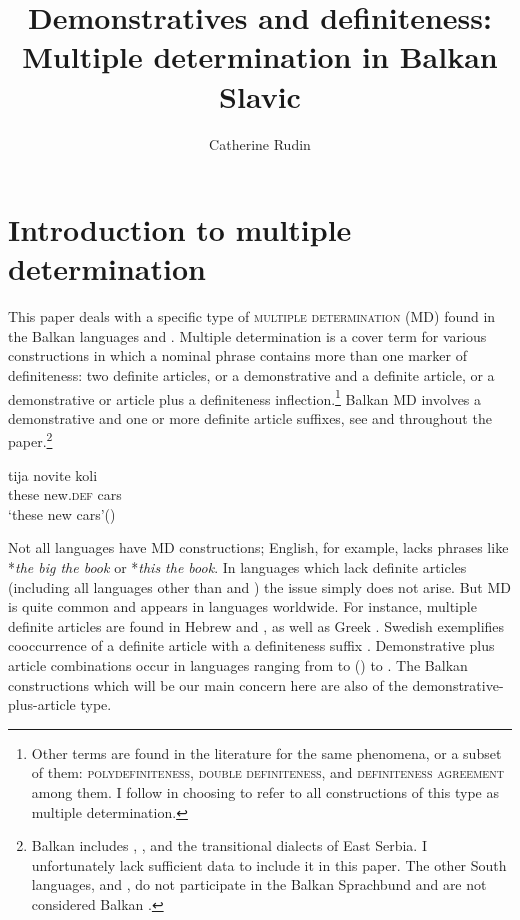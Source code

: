 \documentclass[output=paper]{langscibook}
\author{Catherine Rudin\affiliation{Wayne State College}}
\title[Multiple determination in Balkan Slavic]{Demonstratives and definiteness: Multiple determination in Balkan Slavic}
\begin{document}
\maketitle

\section{Introduction to multiple determination}
This paper deals with a specific type of \textsc{multiple determination} (MD) found in the Balkan  languages  and . Multiple determination is a cover term for various constructions in which a nominal phrase contains more than one marker of definiteness: two definite articles, or a demonstrative and a definite article, or a demonstrative or article plus a definiteness inflection.\footnote{Other terms are found in the literature for the same phenomena, or a subset of them: \textsc{poly\-definiteness, double definiteness}, and \textsc{definiteness agreement} among them. I follow \citet{Joseph2019} in choosing to refer to all constructions of this type as multiple determination.} Balkan  MD involves a demonstrative and one or more definite article suffixes, see  and throughout the paper.\footnote{Balkan  includes , , and the transitional  dialects of East Serbia. I unfortunately lack sufficient  data to include it in this paper. The other South  languages,  and , do not participate in the Balkan Sprachbund and are not considered Balkan .}


\ea \label{ex:cars}
\gll tija novite koli \\
     these new.\textsc{def} cars\\
\glt `these new cars'\hfill ()
\z

\noindent Not all languages have MD constructions; English, for example, lacks phrases like *\textit{the big the book} or *\textit{this the book}. In languages which lack definite articles (including all  languages other than  and ) the issue simply does not arise. But MD is quite common and appears in languages worldwide. For instance, multiple definite articles are found in Hebrew and  \citep{Doron.Khan2015}, as well as Greek \citep{Alexiadou.Wilder1998}. Swedish exemplifies cooccurrence of a definite article with a definiteness suffix \citep{Alexiadou2014}. Demonstrative plus article combinations occur in languages ranging from  to  (\citealt{Giusti2002}) to  \citep{Rudin1993}. The Balkan  constructions which will be our main concern here are also of the demonstrative-plus-article type.
\end{document}
